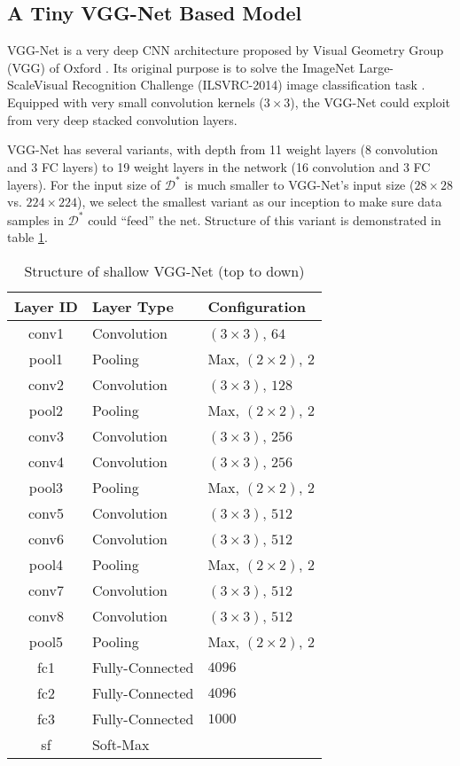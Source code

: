 \subsection{A Tiny VGG-Net Based Model} \label{sec::vggnet}
VGG-Net is a very deep CNN architecture proposed by Visual Geometry Group (VGG) of Oxford \cite{simonyan2014very}.
Its original purpose is to solve the ImageNet Large-ScaleVisual Recognition Challenge
(ILSVRC-2014) image classification task \cite{russakovsky2015imagenet}.
Equipped with very small convolution kernels ($3 \times 3$), the VGG-Net could exploit from very deep
stacked convolution layers.

VGG-Net has several variants, with depth from 11 weight layers (8 convolution and 3 FC layers) 
to 19 weight layers in the network (16 convolution and 3 FC layers). For the input size of $\mathcal{D}^*$
is much smaller to VGG-Net's input size ($28 \times 28$ vs. $224 \times 224$),
we select the smallest variant as our inception to make sure data samples in $\mathcal{D}^*$ could ``feed'' the net.
Structure of this variant is demonstrated in table \ref{tab::VGG-Net}.

\begin{table}[htb]
    \centering
    \caption{Structure of shallow VGG-Net (top to down)}
    \label{tab::VGG-Net}
    \begin{tabular}{cll}
        \toprule
        Layer ID & Layer Type & Configuration \\
        \midrule
        conv1 & Convolution & $\left(3\times3\right)$, $64$ \\
        pool1 & Pooling       & Max, $\left(2\times2\right)$, $2$ \\
        conv2 & Convolution & $\left(3\times3\right)$, $128$ \\
        pool2 & Pooling       & Max, $\left(2\times2\right)$, $2$ \\
        conv3 & Convolution & $\left(3\times3\right)$, $256$ \\
        conv4 & Convolution & $\left(3\times3\right)$, $256$ \\
        pool3 & Pooling       & Max, $\left(2\times2\right)$, $2$ \\
        conv5 & Convolution & $\left(3\times3\right)$, $512$ \\
        conv6 & Convolution & $\left(3\times3\right)$, $512$ \\
        pool4 & Pooling       & Max, $\left(2\times2\right)$, $2$ \\
        conv7 & Convolution & $\left(3\times3\right)$, $512$ \\
        conv8 & Convolution & $\left(3\times3\right)$, $512$ \\
        pool5 & Pooling       & Max, $\left(2\times2\right)$, $2$ \\
        fc1   & Fully-Connected & $4096$ \\
        fc2   & Fully-Connected & $4096$ \\
        fc3   & Fully-Connected & $1000$ \\
        sf    & Soft-Max      & \\
        \bottomrule
    \end{tabular}
\end{table}

